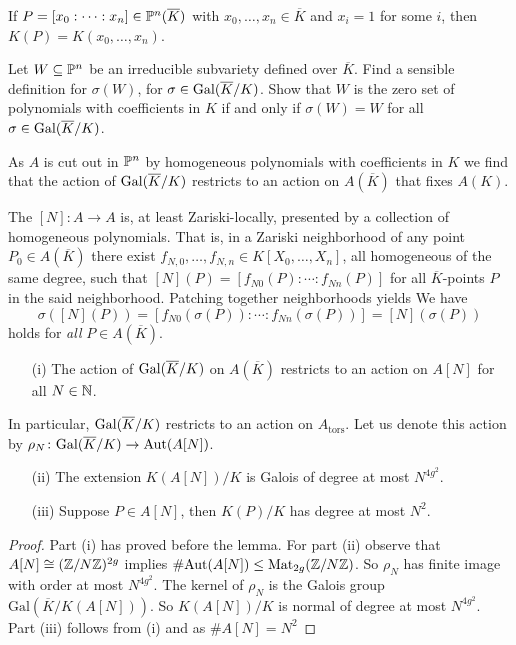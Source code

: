 If $P=[x_0:\cdots:x_n] \in {\mathbb{P}}^n(\overline K)$ with
$x_0,\ldots,x_n\in\overline K$ and $x_i=1$ for some
$i$, then $K(P) = K(x_0,\ldots,x_n)$. 

\begin{exercise}
  Let $W\subseteq{\mathbb{P}}^n$ be an irreducible subvariety defined
  over $\overline K$. Find a sensible definition for $\sigma(W)$,
  for $\sigma\in \mathrm{Gal}(\overline{K}/K)$.  Show that $W$ is the zero set of
  polynomials with coefficients in $K$ if and only if $\sigma(W)=W$
  for all $\sigma\in \mathrm{Gal}(\overline{K}/K)$.
\end{exercise}


As $A$ is cut out in ${\mathbb{P}}^n$ by homogeneous polynomials with
coefficients in $K$ we find that the action of $\mathrm{Gal}(\overline{K}/K)$ restricts to
an action on
$A(\overline K)$ that fixes $A(K)$.

The $[N]\colon A\rightarrow A$ is, at least Zariski-locally, presented
by a collection of homogeneous polynomials. That is, in a Zariski
neighborhood of any point $P_0\in A(\overline K)$ there exist
$f_{N,0},\ldots,f_{N,n}\in K[X_0,\ldots,X_n]$, all homogeneous of the
same degree, such that 
$[N](P) = [f_{N0}(P):\cdots:f_{Nn}(P)]$ for all $\overline K$-points  $P$ in the said
neighborhood.
Patching together neighborhoods yields
We have
$$\sigma([N](P)) = [f_{N0}(\sigma(P)):\cdots:f_{Nn}(\sigma(P))] =
[N](\sigma(P))$$
holds for \textit{all} $P\in A(\overline K)$.


\begin{lemma}\label{lem:galoisactionav}
  \begin{enumerate}
  \item [(i)]
    The
    action of $\mathrm{Gal}(\overline{K}/K)$ on $A(\overline K)$ restricts to an action on
    $A[N]$ for all $N\in{\mathbb{N}}$.
  \end{enumerate}
  In particular, $\mathrm{Gal}(\overline{K}/K)$ restricts to
  an action on $A_{\mathrm{tors}}$. 
  Let us denote this action by
  $\rho_N\colon \mathrm{Gal}(\overline{K}/K)\rightarrow \mathrm{Aut}(A[N])$.
  \begin{enumerate}
  \item[(ii)]
    The extension $K(A[N])/K$ is Galois
    of degree at most $N^{4g^2}$.
  \item[(iii)] Suppose $P\in A[N]$, then $K(P)/K$ has degree at most
    $N^2$. 
  \end{enumerate}
\end{lemma}
\begin{proof}
  Part (i) has proved before the lemma.  For part (ii) observe that
  $A[N]\cong
  ({\mathbb{Z}}/N{\mathbb{Z}})^{2g}$ implies
  $\#\mathrm{Aut}(A[N])\le \mathrm{Mat}_{2g}({{\mathbb{Z}}/N{\mathbb{Z}}})$.
  So  $\rho_N$ has finite image with order at most $N^{4g^2}$. The kernel
  of $\rho_N$ is the Galois group $\mathrm{Gal}(\overline K/K(A[N]))$.
  So $K(A[N])/K$ is normal of degree at most $N^{4g^2}$.
  Part (iii) follows from (i) and as $\#A[N]=N^2$  
\end{proof}

